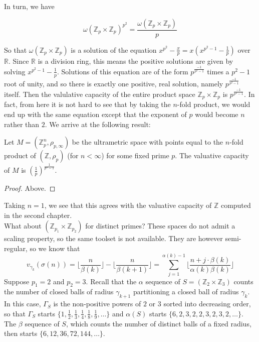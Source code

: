 In turn, we have 


\[ \omega(\mathbb{Z}_p \times \mathbb{Z}_p)^{p^2} =  \frac{\omega(\mathbb{Z}_p \times \mathbb{Z}_p)}{p}  \]

So that $\omega(\mathbb{Z}_p \times \mathbb{Z}_p)$ is a solution of the equation $x^{p^2} - \frac{x}{p} = x(x^{p^2-1} - \frac{1}{p})$ over $\mathbb{R}$. Since $\mathbb{R}$ is a division ring, this means the positive solutions are given by solving $x^{p^2-1}-\frac{1}{p}$. Solutions of this equation are of the form $p^{\frac{-1}{p^2-1}}$ times a $p^2-1$ root of unity, and so there is exactly one positive, real solution, namely $p^{\frac{-1}{p^2-1}}$ itself. Then the valulative capacity of the entire product space $\mathbb{Z}_p \times \mathbb{Z}_p$ is $p^{\frac{-1}{p^2-1}}$. In fact, from here it is not hard to see that by taking the $n$-fold product, we would end up with the same equation except that the exponent of $p$ would become $n$ rather than $2$. We arrive at the following result:\\

\begin{proposition}
Let $M=(\mathbb{Z}_p^n, \rho_{p, \infty})$ be the ultrametric space with points equal to the $n$-fold product of $(\mathbb{Z}, \rho_p)$ (for $n < \infty$) for some fixed prime $p$. The valuative capacity of $M$ is  $(\frac{1}{p})^{\frac{1}{p^n-1}}$.
\end{proposition}

\begin{proof}
Above.
\end{proof}

Taking $n=1$, we see that this agrees with the valuative capacity of $\mathbb{Z}$ computed in the second chapter. \\

What about $(\mathbb{Z}_{p_1} \times \mathbb{Z}_{p_2})$ for distinct primes? These spaces do not admit a scaling property, so the same toolset is not available. They are however semi-regular, so we know that\\  \[v_{\gamma_k}(\sigma(n)) =  \lfloor\frac{n}{\beta(k)}\rfloor - \lfloor\frac{n}{\beta(k+1)}\rfloor = \sum_{j=1}^{\alpha(k)-1} \lfloor \frac{n + j\cdot \beta(k)}{\alpha(k)\beta(k)} \rfloor \]
Suppose $p_1 =2$ and $p_2 =3$. Recall that the $\alpha$ sequence of $S=(\mathbb{Z}_{2} \times \mathbb{Z}_{3})$ counts the number of closed balls of radius $\gamma_{k+1}$ partitioning a closed ball of radius $\gamma_k$. In this case, $\Gamma_S$ is the non-positive powers of $2$ or $3$ sorted into decreasing order, so that $\Gamma_S$ starts $\{1, \frac{1}{2},\frac{1}{3},\frac{1}{4},\frac{1}{8},\frac{1}{9},\ldots \}$ and $\alpha(S)$ starts $\{6,2,3,2,2,3,2,3,2,\ldots\}$. The $\beta$ sequence of $S$, which counts the number of distinct balls of a fixed radius, then starts $\{6,12,36,72,144,\ldots\}$.\\

